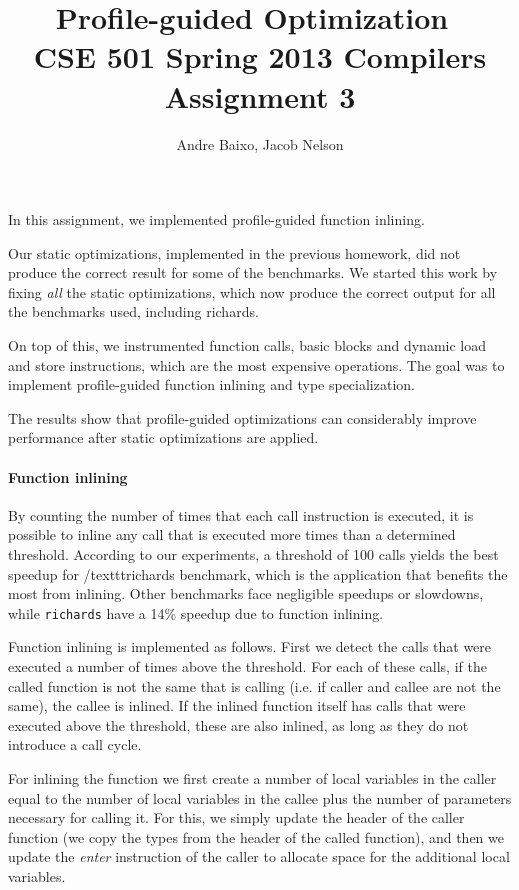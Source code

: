 \documentclass[10pt,twocolumn]{article}
\begin{document}
\title{Profile-guided Optimization\ \\
  \small CSE 501 Spring 2013 Compilers Assignment 3}
\author{Andre Baixo, Jacob Nelson}
\maketitle

In this assignment, we implemented profile-guided function inlining.

Our static optimizations, implemented in the previous homework, did not
produce the correct result for some of the benchmarks. We started this
work by fixing \emph{all} the static optimizations, which now produce
the correct output for all the benchmarks used, including richards.

On top of this, we instrumented function calls, basic blocks and
dynamic load and store instructions, which are the most expensive
operations. The goal was to implement profile-guided function inlining and type specialization.

The results show that profile-guided optimizations can considerably improve performance
after static optimizations are applied.

\paragraph{Function inlining}
By counting the number of times that each call instruction is executed, it is possible to inline any call that is executed more times than a determined threshold. According to our experiments, a threshold of 100 calls yields the best speedup for /texttt{richards} benchmark, which is the application that benefits the most from inlining. Other benchmarks face negligible speedups or slowdowns, while \texttt{richards} have a 14\% speedup due to function inlining.

Function inlining is implemented as follows. First we detect the calls that were executed a number of times above the threshold. For each of these calls, if the called function is not the same that is calling (i.e. if caller and callee are not the same), the callee is inlined. If the inlined function itself has calls that were executed above the threshold, these are also inlined, as long as they do not introduce a call cycle.

For inlining the function we first create a number of local variables in the caller equal to the number of local variables in the callee plus the number of parameters necessary for calling it. For this, we simply update the header of the caller function (we copy the types from the header of the called function), and then we update the \emph{enter} instruction of the caller to allocate space for the additional local variables.
\end{document}
